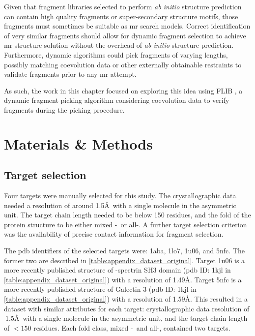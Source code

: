 Given that fragment libraries selected to perform \textit{ab initio} structure prediction can contain high quality fragments or super-secondary structure motifs, those fragments must sometimes be suitable as \gls{mr} search models. Correct identification of very similar fragments should allow for dynamic fragment selection to achieve \gls{mr} structure solution without the overhead of \textit{ab initio} structure prediction. Furthermore, dynamic algorithms could pick fragments of varying lengths, possibly matching coevolution data or other externally obtainable restraints to validate fragments prior to any \gls{mr} attempt. 

As such, the work in this chapter focused on exploring this idea using FLIB \cite{De_Oliveira2015-kb}, a dynamic fragment picking algorithm considering coevolution data to verify fragments during the picking procedure.

\section{Materials \& Methods}
\subsection{Target selection}
Four targets were manually selected for this study. The crystallographic data needed a resolution of around 1.5\AA\ with a single molecule in the asymmetric unit. The target chain length needed to be below 150 residues, and the fold of the protein structure to be either mixed \textalpha-\textbeta\ or all-\textbeta. A further target selection criterion was the availability of precise contact information for fragment selection.

The \gls{pdb} identifiers of the selected targets were: 1aba, 1lo7, 1u06, and 5nfc. The former two are described in \cref{table:appendix_dataset_original}. Target 1u06 is a more recently published structure of \textalpha-spectrin SH3 domain (\gls{pdb} ID: 1kjl in \cref{table:appendix_dataset_original}) with a resolution of 1.49\AA. Target 5nfc is a more recently published structure of Galectin-3 (\gls{pdb} ID: 1kjl in \cref{table:appendix_dataset_original}) with a resolution of 1.59\AA. This resulted in a dataset with similar attributes for each target: crystallographic data resolution of $~1.5$\AA\ with a single molecule in the asymmetric unit, and the target chain length of $<150$ residues. Each fold class, mixed \textalpha-\textbeta\ and all-\textbeta, contained two targets.

